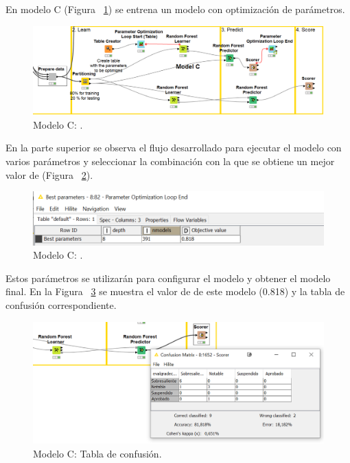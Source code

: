 En modelo C (Figura ~\ref{fig:workflowC1}) se entrena un modelo  con optimización de parámetros. 

\begin{figure}[!htb]
	\centering
	\includegraphics[width=1\textwidth]{img/workflowC1.png}
	\caption{Modelo C: .}
	\label{fig:workflowC1}
\end{figure}
\FloatBarrier

En la parte superior se observa el flujo desarrollado para ejecutar el modelo con varios parámetros y seleccionar la combinación con la 
que se obtiene un mejor valor de  (Figura ~\ref{fig:workflowC2}). 

\begin{figure}[!htb]
	\centering
	\includegraphics[width=1\textwidth]{img/workflowC2.png}
	\caption{Modelo C: .}
	\label{fig:workflowC2}
\end{figure}
\FloatBarrier

Estos parámetros se utilizarán para configurar el modelo y obtener el modelo final. En la Figura ~\ref{fig:workflowC3} se muestra
el valor de  de este modelo (0.818) y la tabla de confusión correspondiente. 

\begin{figure}[!htb]
	\centering
	\includegraphics[width=1\textwidth]{img/workflowC3.png}
	\caption{Modelo C: Tabla de confusión.}
	\label{fig:workflowC3}
\end{figure}
\FloatBarrier

